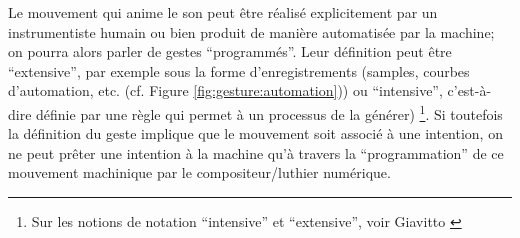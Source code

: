 \noindent Le mouvement qui anime le son peut être réalisé explicitement par un instrumentiste humain ou bien produit de manière automatisée par la machine; on pourra alors parler de gestes ``programmés''. Leur définition peut être ``extensive'', par exemple sous la forme d'enregistrements (samples, courbes d'automation, etc. (cf. Figure \ref{fig:gesture:automation})) ou ``intensive'', c'est-à-dire définie par une règle qui permet à un processus de la générer) \footnote{Sur les notions de notation ``intensive'' et ``extensive'', voir Giavitto \cite{giavitto_du_2014}}. Si toutefois la définition du geste implique que le mouvement soit associé à une intention, on ne peut prêter une intention à la machine qu'à travers la ``programmation'' de ce mouvement machinique par le compositeur/luthier numérique.\\
